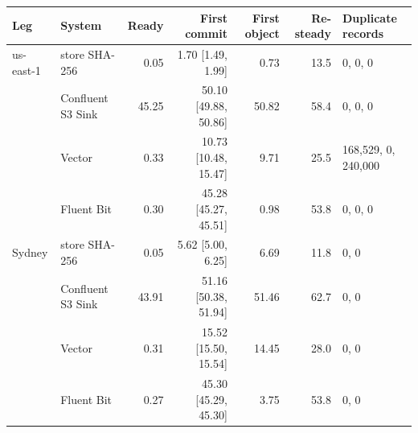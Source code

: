 
\begin{tabular}{@{}llrrrrl@{}}
\toprule
Leg & System & Ready & First commit & First object & Re-steady & Duplicate records \\
\midrule
us-east-1 & \sysname{} store SHA-256 & 0.05 & 1.70 [1.49, 1.99] & 0.73 & 13.5 & 0, 0, 0 \\
 & Confluent S3 Sink & 45.25 & 50.10 [49.88, 50.86] & 50.82 & 58.4 & 0, 0, 0 \\
 & Vector & 0.33 & 10.73 [10.48, 15.47] & 9.71 & 25.5 & 168{,}529, 0, 240{,}000 \\
 & Fluent Bit & 0.30 & 45.28 [45.27, 45.51] & 0.98 & 53.8 & 0, 0, 0 \\
\addlinespace[1pt]
Sydney & \sysname{} store SHA-256 & 0.05 & 5.62 [5.00, 6.25] & 6.69 & 11.8 & 0, 0 \\
 & Confluent S3 Sink & 43.91 & 51.16 [50.38, 51.94] & 51.46 & 62.7 & 0, 0 \\
 & Vector & 0.31 & 15.52 [15.50, 15.54] & 14.45 & 28.0 & 0, 0 \\
 & Fluent Bit & 0.27 & 45.30 [45.29, 45.30] & 3.75 & 53.8 & 0, 0 \\
\bottomrule
\end{tabular}
